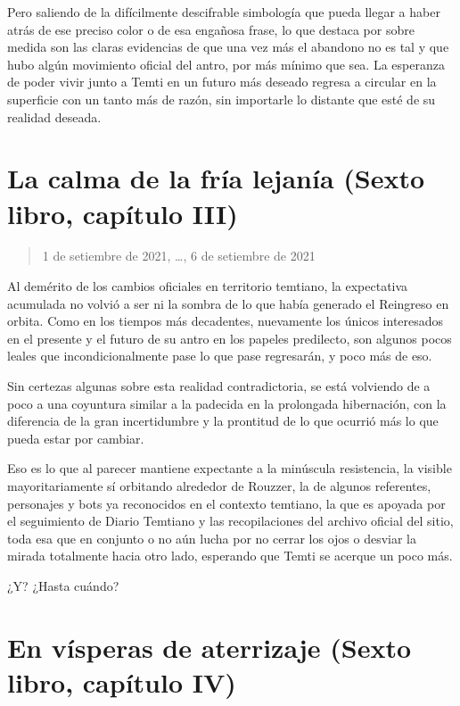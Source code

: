 \documentclass[
]{book}
\begin{document}
Pero saliendo de la difícilmente descifrable simbología que pueda llegar a haber atrás de ese preciso color o de esa engañosa frase, lo que destaca por sobre medida son las claras evidencias de que una vez más el abandono no es tal y que hubo algún movimiento oficial del antro, por más mínimo que sea. La esperanza de poder vivir junto a Temti en un futuro más deseado regresa a circular en la superficie con un tanto más de razón, sin importarle lo distante que esté de su realidad deseada.

\hypertarget{la-calma-de-la-fruxeda-lejanuxeda-sexto-libro-capuxedtulo-iii}{%
\section{La calma de la fría lejanía (Sexto libro, capítulo III)}\label{la-calma-de-la-fruxeda-lejanuxeda-sexto-libro-capuxedtulo-iii}}

\begin{quote}
1 de setiembre de 2021, \ldots, 6 de setiembre de 2021
\end{quote}

Al demérito de los cambios oficiales en territorio temtiano, la expectativa acumulada no volvió a ser ni la sombra de lo que había generado el Reingreso en orbita. Como en los tiempos más decadentes, nuevamente los únicos interesados en el presente y el futuro de su antro en los papeles predilecto, son algunos pocos leales que incondicionalmente pase lo que pase regresarán, y poco más de eso.

Sin certezas algunas sobre esta realidad contradictoria, se está volviendo de a poco a una coyuntura similar a la padecida en la prolongada hibernación, con la diferencia de la gran incertidumbre y la prontitud de lo que ocurrió más lo que pueda estar por cambiar.

Eso es lo que al parecer mantiene expectante a la minúscula resistencia, la visible mayoritariamente sí orbitando alrededor de Rouzzer, la de algunos referentes, personajes y bots ya reconocidos en el contexto temtiano, la que es apoyada por el seguimiento de Diario Temtiano y las recopilaciones del archivo oficial del sitio, toda esa que en conjunto o no aún lucha por no cerrar los ojos o desviar la mirada totalmente hacia otro lado, esperando que Temti se acerque un poco más.

¿Y? ¿Hasta cuándo?

\hypertarget{en-vuxedsperas-de-aterrizaje-sexto-libro-capuxedtulo-iv}{%
\section{En vísperas de aterrizaje (Sexto libro, capítulo IV)}\label{en-vuxedsperas-de-aterrizaje-sexto-libro-capuxedtulo-iv}}
\end{document}
